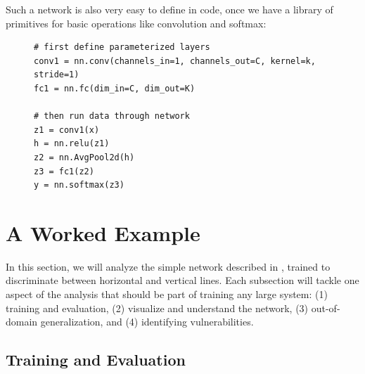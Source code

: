 Such a network is also very easy to define in code, once we have a library of primitives for basic operations like convolution and softmax:

\begin{figure}[h]
    \begin{minipage}{1.0\linewidth}
        \begin{verbatim}
# first define parameterized layers
conv1 = nn.conv(channels_in=1, channels_out=C, kernel=k, stride=1)
fc1 = nn.fc(dim_in=C, dim_out=K)

# then run data through network
z1 = conv1(x)
h = nn.relu(z1)
z2 = nn.AvgPool2d(h)
z3 = fc1(z2)
y = nn.softmax(z3)
\end{verbatim}
    \end{minipage}
\end{figure}



\section{A Worked Example}

In this section, we will analyze the simple network described in \sect{\ref{sec:convolutional_neural_nets:simple_CNN}}, trained to discriminate between horizontal and vertical lines. Each subsection will tackle one aspect of the analysis that should be part of training any large system: (1) training and evaluation, (2) visualize and understand the network, (3) out-of-domain generalization, and (4) identifying vulnerabilities.

\subsection{Training and Evaluation}

